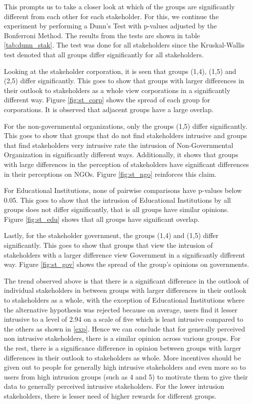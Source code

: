 This prompts us to take a closer look at which of the groups are significantly different from each other for each stakeholder. For this, we continue the experiment by performing a Dunn's Test with p-values adjusted by the Bonferroni Method. The results from the tests are shown in table \ref{tab:dunn_stak}. The test was done for all stakeholders since the Kruskal-Wallis test denoted that all groups differ significantly for all stakeholders. 

Looking at the stakeholder corporation, it is seen that groups (1,4), (1,5) and (2,5) differ significantly. This goes to show that groups with larger differences in their outlook to stakeholders as a whole view corporations in a significantly different way. Figure \ref{fig:st_corp} shows the spread of each group for corporations. It is observed that adjacent groups have a large overlap.

For the non-governmental organizations, only the groups (1,5) differ significantly. This goes to show that groups that do not find stakeholders intrusive and groups that find stakeholders very intrusive rate the intrusion of Non-Governmental Organization in significantly different ways. Additionally, it shows that groups with large differences in the perception of stakeholders have significant differences in their perceptions on NGOs. Figure \ref{fig:st_ngo} reinforces this claim.

For Educational Institutions, none of pairwise comparisons have p-values below 0.05. This goes to show that the intrusion of Educational Institutions by all groups does not differ significantly, that is all groups have similar opinions. Figure \ref{fig:st_edu} shows that all groups have significant overlap.

Lastly, for the stakeholder government, the groups (1,4) and (1,5) differ significantly. This goes to show that groups that view the intrusion of stakeholders with a larger difference view Government in a significantly different way. Figure \ref{fig:st_gov} shows the spread of the group's opinions on governments. 

The trend observed above is that there is a significant difference in the outlook of individual stakeholders in between groups with larger differences
in their outlook to stakeholders as a whole, with the exception of Educational Institutions where the alternative hypothesis was rejected because on average, users find it lesser intrusive to a level of 2.94 on a scale of five which is least intrusive compared to the others as shown in \ref{exp}. Hence we can conclude that for generally perceived non intrusive stakeholders, there is a similar opinion across various groups. For the rest, there is a significance difference in opinion between groups with larger differences in their outlook to stakeholders as whole. More incentives should be given out to people for generally high intrusive stakeholders and even more so to users from high intrusion groups (such as 4 and 5) to motivate them to give their data to generally perceived intrusive stakeholders. For the lower intrusion stakeholders, there is lesser need of higher rewards for different groups.

